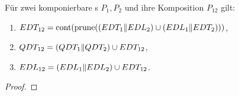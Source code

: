 \begin{Satz}
  Für zwei komponierbare \MEIO{}s $P_1,P_2$ und ihre Komposition $P_{12}$ gilt:
  \begin{enumerate}
    \item $EDT _{12} =\mathrm{cont} (\mathrm{prune} ((EDT _1\|EDL _2)\cup (EDL _1\|EDT
      _2)))$,
    \item $QDT _{12} =(QDT _1\|QDT _2)\cup EDT _{12}$,
    \item $EDL _{12} =(EDL _1\|EDL _2)\cup EDT _{12}$.
  \end{enumerate}
\end{Satz}

\begin{proof}
\end{proof}
